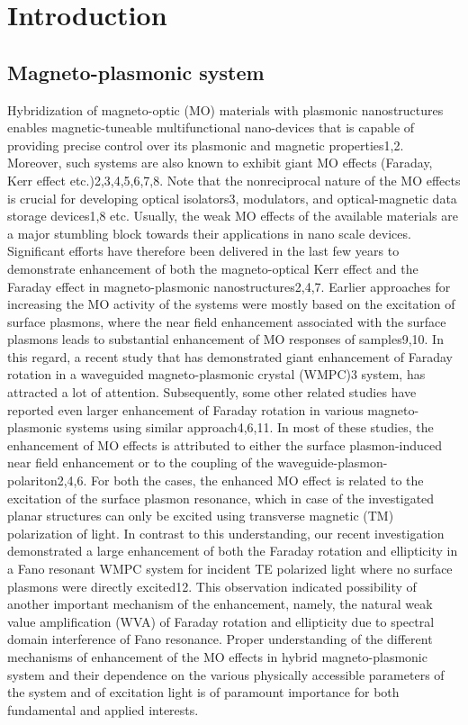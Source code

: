 \documentclass[13pt]{article}
\begin{document}
\section{Introduction}
\subsection{Magneto-plasmonic system}
\noindent
\par
	Hybridization of magneto-optic (MO) materials with plasmonic nanostructures enables magnetic-tuneable multifunctional nano-devices that is capable of providing precise control over its plasmonic and magnetic properties1,2. Moreover, such systems are also known to exhibit giant MO effects (Faraday, Kerr effect etc.)2,3,4,5,6,7,8. Note that the nonreciprocal nature of the MO effects is crucial for developing optical isolators3, modulators, and optical-magnetic data storage devices1,8 etc. Usually, the weak MO effects of the available materials are a major stumbling block towards their applications in nano scale devices. Significant efforts have therefore been delivered in the last few years to demonstrate enhancement of both the magneto-optical Kerr effect and the Faraday effect in magneto-plasmonic nanostructures2,4,7. Earlier approaches for increasing the MO activity of the systems were mostly based on the excitation of surface plasmons, where the near field enhancement associated with the surface plasmons leads to substantial enhancement of MO responses of samples9,10. In this regard, a recent study that has demonstrated giant enhancement of Faraday rotation in a waveguided magneto-plasmonic crystal (WMPC)3 system, has attracted a lot of attention. Subsequently, some other related studies have reported even larger enhancement of Faraday rotation in various magneto-plasmonic systems using similar approach4,6,11. In most of these studies, the enhancement of MO effects is attributed to either the surface plasmon-induced near field enhancement or to the coupling of the waveguide-plasmon-polariton2,4,6. For both the cases, the enhanced MO effect is related to the excitation of the surface plasmon resonance, which in case of the investigated planar structures can only be excited using transverse magnetic (TM) polarization of light. In contrast to this understanding, our recent investigation demonstrated a large enhancement of both the Faraday rotation and ellipticity in a Fano resonant WMPC system for incident TE polarized light where no surface plasmons were directly excited12. This observation indicated possibility of another important mechanism of the enhancement, namely, the natural weak value amplification (WVA) of Faraday rotation and ellipticity due to spectral domain interference of Fano resonance. Proper understanding of the different mechanisms of enhancement of the MO effects in hybrid magneto-plasmonic system and their dependence on the various physically accessible parameters of the system and of excitation light is of paramount importance for both fundamental and applied interests.
\end{document}
